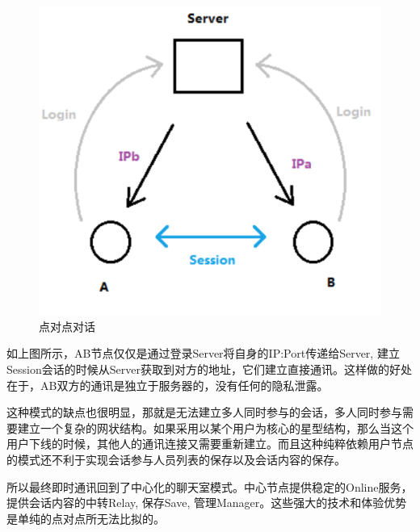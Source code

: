 \documentclass[a4paper,12pt]{article}
\begin{document}
\begin {figure} [htbp]
\centering \includegraphics [width = 5in] {pic_cn/c1.png}
\caption {点对点对话} \label {fig: c1}
\end {figure}

如上图所示，AB节点仅仅是通过登录Server将自身的IP:Port传递给Server, 建立Session会话的时候从Server获取到对方的地址，它们建立直接通讯。这样做的好处在于，AB双方的通讯是独立于服务器的，没有任何的隐私泄露。

这种模式的缺点也很明显，那就是无法建立多人同时参与的会话，多人同时参与需要建立一个复杂的网状结构。如果采用以某个用户为核心的星型结构，那么当这个用户下线的时候，其他人的通讯连接又需要重新建立。而且这种纯粹依赖用户节点的模式还不利于实现会话参与人员列表的保存以及会话内容的保存。

所以最终即时通讯回到了中心化的聊天室模式。中心节点提供稳定的Online服务，提供会话内容的中转Relay, 保存Save, 管理Manager。这些强大的技术和体验优势是单纯的点对点所无法比拟的。
\end{document}
